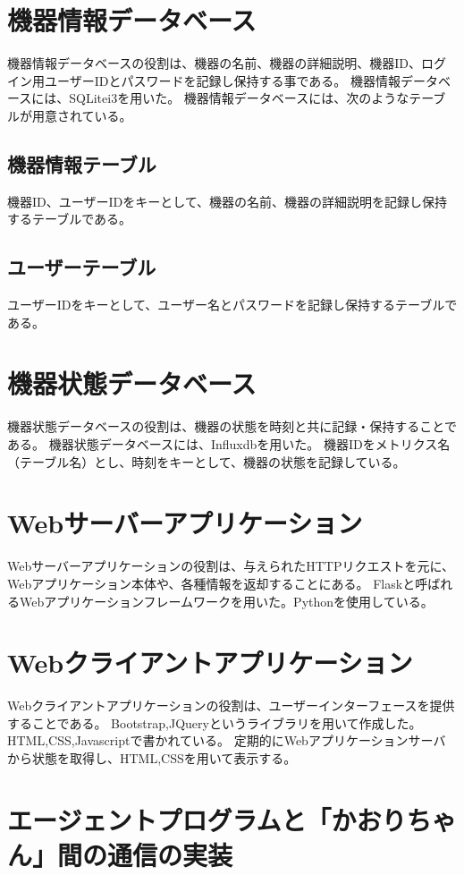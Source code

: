 \section{機器情報データベース}
機器情報データベースの役割は、機器の名前、機器の詳細説明、機器ID、ログイン用ユーザーIDとパスワードを記録し保持する事である。
機器情報データベースには、SQLitei3を用いた。
機器情報データベースには、次のようなテーブルが用意されている。
\subsection{機器情報テーブル}
機器ID、ユーザーIDをキーとして、機器の名前、機器の詳細説明を記録し保持するテーブルである。
\subsection{ユーザーテーブル}
ユーザーIDをキーとして、ユーザー名とパスワードを記録し保持するテーブルである。

\section{機器状態データベース}
機器状態データベースの役割は、機器の状態を時刻と共に記録・保持することである。
機器状態データベースには、Influxdbを用いた。
機器IDをメトリクス名（テーブル名）とし、時刻をキーとして、機器の状態を記録している。

\section{Webサーバーアプリケーション}
Webサーバーアプリケーションの役割は、与えられたHTTPリクエストを元に、Webアプリケーション本体や、各種情報を返却することにある。
Flaskと呼ばれるWebアプリケーションフレームワークを用いた。Pythonを使用している。

\section{Webクライアントアプリケーション}
Webクライアントアプリケーションの役割は、ユーザーインターフェースを提供することである。
Bootstrap,JQueryというライブラリを用いて作成した。HTML,CSS,Javascriptで書かれている。
定期的にWebアプリケーションサーバから状態を取得し、HTML,CSSを用いて表示する。

\section{エージェントプログラムと「かおりちゃん」間の通信の実装}


